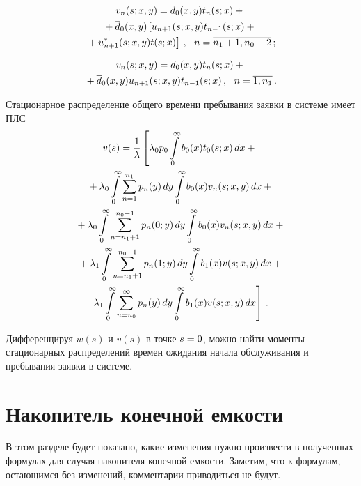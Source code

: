 \begin{multicols}{2}
\vspace*{-12pt}

\noindent
\begin{multline}
\label{5-5-2-m}
v_{n}(s;x,y) = d_0(x,y) t_{n}(s;x) +{}\\
{}+
\overline d_0(x,y) \left[ u_{n+1}(s;x,y) t_{n-1}(s;x) +{}\right.\\
\left.{}+ u^*_{n+1}(s;x,y) t(s;x)\right]\,,
\ \ n=\overline{n_1+1,n_0-2}\,;
\end{multline}

\vspace*{-20pt}

\noindent
\begin{multline*}
v_{n}(s;x,y)= d_0(x,y) t_{n}(s;x) + {}\\
{}+\overline d_0(x,y) u_{n+1}(s;x,y) t_{n-1}(s;x)\,,
\ \ n=\overline{1,n_1}\,.
\end{multline*}

Стационарное распределение общего времени пребывания
заявки в системе имеет ПЛС
\begin{multline*}
v(s) = \displaystyle\frac{\displaystyle 1\mathstrut}{\displaystyle \lambda\mathstrut} \left[
\lambda_0 p_0 \int\limits_0^\infty b_0(x) t_0(s;x) \, dx
+ {}\right.\\
{}+\lambda_0 \int\limits_0^\infty \sum\limits_{n=1}^{n_1} p_n(y) \, dy
\int\limits_0^\infty b_0(x) v_n(s;x,y) \, dx +{}
\\
{}+
\lambda_0 \int\limits_0^\infty \sum\limits_{n=n_1+1}^{n_0-1}
p_n(0;y)\, dy \int\limits_0^\infty b_0(x) v_n(s;x,y) \, dx
+{}
\\
{}+
\lambda_1 \int\limits_0^\infty \sum\limits_{n=n_1+1}^{n_0-1}
p_n(1;y)\, dy \int\limits_0^\infty b_1(x) v(s;x,y) \, dx
+{}\\
\left. \lambda_1 \int\limits_0^\infty \sum\limits_{n=n_0}^{\infty}
p_n(y)\, dy \int\limits_0^\infty b_1(x) v(s;x,y)\, dx
\right]\,.
\end{multline*}

Дифференцируя $w(s)$ и $v(s)$ в точке $s\hm=0$,
можно найти моменты стационарных распределений времен
ожидания начала обслуживания и пребывания заявки в
сис\-теме.

\section{Накопитель конечной емкости}

В этом разделе будет показано, какие изменения нужно
произвести в полученных формулах для случая накопителя
конечной емкости.
Заметим, что к формулам, остающимся без изменений,
комментарии приводиться не будут.



\end{multicols}
